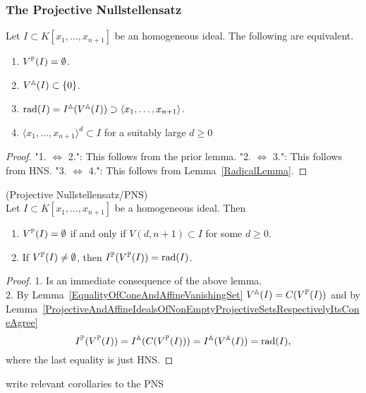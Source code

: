 \subsubsection{The Projective Nullstellensatz}
    \begin{lemma}\label{PNSLemma}
        Let $I\subset K[x_1,\dots,x_{n+1}]$ be an homogeneous ideal. The following are equivalent.
        \begin{enumerate}
            \item $V^{\mathbb{P}}(I)=\emptyset$.
            \item $V^{\mathbb{A}}(I)\subset \{0\}$.
            \item $\mathrm{rad}(I)=I^{\mathbb{A}}(V^{\mathbb{A}}(I))\supset \langle x_1,\dots,x_{n+1}\rangle$.
            \item $\langle x_1,\dots,x_{n+1}\rangle^d \subset I $ for a suitably large $d\geq 0$
        \end{enumerate}
    \end{lemma}
    \begin{proof}
        "1. $\iff$ 2.": This follows from the prior lemma. "2. $\iff$ 3.": This follows from HNS. "3. $\iff$ 4.": This follows from Lemma~\ref{RadicalLemma}.
    \end{proof}
    \begin{theorem}\label{ProjectiveNullstellenSatz}(Projective Nullstellensatz/PNS)\\
        Let $I\subset K[x_1,\dots,x_{n+1}]$ be a homogeneous ideal. Then 
        \begin{enumerate}
            \item $V^{\mathbb{P}}(I)=\emptyset $ if and only if $V(d,n+1)\subset I$ for some $d\geq 0$.
            \item If $V^{\mathbb{P}}(I)\neq \emptyset$, then $I^{\mathbb{P}}(V^{\mathbb{P}}(I))=\mathrm{rad}(I)$.
        \end{enumerate}
    \end{theorem}
    \begin{proof}
        1. Is an immediate consequence of the above lemma.\\
        2. By Lemma~\ref{EqualityOfConeAndAffineVanishingSet} $V^{\mathbb{A}}(I)=C(V^{\mathbb{P}}(I))$ and by Lemma~\ref{ProjectiveAndAffineIdealsOfNonEmptyProjectiveSetsRespectivelyItsConeAgree}
        $$I^{\mathbb{P}}(V^{\mathbb{P}}(I))=I^{\mathbb{A}}(C(V^{\mathbb{P}}(I)))=I^{\mathbb{A}}(V^{\mathbb{A}}(I))=\mathrm{rad}(I),$$
        where the last equality is just HNS.
    \end{proof}
    {\Large write relevant corollaries to the PNS}
